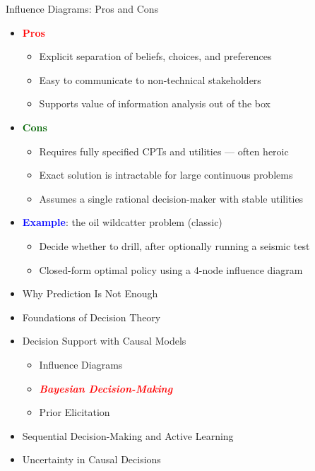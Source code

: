 \documentclass[
  10pt,
  ignorenonframetext,
]{beamer}
\providecommand{\tightlist}{%
  \setlength{\itemsep}{0pt}\setlength{\parskip}{0pt}}
\begin{document}
\begin{frame}{Influence Diagrams: Pros and Cons}
\label{influence-diagrams-pros-and-cons}
\begin{itemize}
\tightlist
\item
  \textbf{\textcolor{red}{Pros}}

  \begin{itemize}
  \tightlist
  \item
    Explicit separation of beliefs, choices, and preferences
  \item
    Easy to communicate to non-technical stakeholders
  \item
    Supports value of information analysis out of the box
  \end{itemize}
\item
  \textbf{\textcolor{darkgreen}{Cons}}

  \begin{itemize}
  \tightlist
  \item
    Requires fully specified CPTs and utilities --- often heroic
  \item
    Exact solution is intractable for large continuous problems
  \item
    Assumes a single rational decision-maker with stable utilities
  \end{itemize}
\item
  \textbf{\textcolor{blue}{Example}}: the oil wildcatter problem
  (classic)

  \begin{itemize}
  \tightlist
  \item
    Decide whether to drill, after optionally running a seismic test
  \item
    Closed-form optimal policy using a 4-node influence diagram
  \end{itemize}
\end{itemize}
\end{frame}

\begin{frame}{}
\label{section-10}
\begin{itemize}
\tightlist
\item
  Why Prediction Is Not Enough
\item
  Foundations of Decision Theory
\item
  Decision Support with Causal Models

  \begin{itemize}
  \tightlist
  \item
    Influence Diagrams
  \item
    \emph{\textbf{\textcolor{red}{Bayesian Decision-Making}}}
  \item
    Prior Elicitation
  \end{itemize}
\item
  Sequential Decision-Making and Active Learning
\item
  Uncertainty in Causal Decisions
\end{itemize}
\end{frame}
\end{document}
